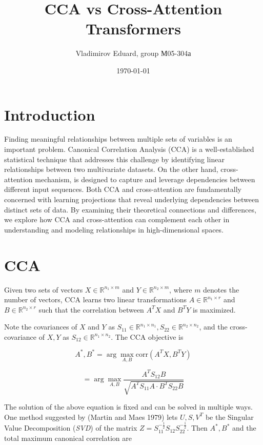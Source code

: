\documentclass[a4paper,14pt]{article}
\author{Vladimirov Eduard, group М05-304а}
\title{\textbf{CCA vs Cross-Attention Transformers}}
\date{\today}
\newcommand{\dR}{\mathbb{R}}
\theoremstyle{plain} %
\theoremstyle{definition} %
\theoremstyle{remark} %
\begin{document}
	\maketitle
	
	\section*{Introduction}
	
	Finding meaningful relationships between multiple sets of variables is an important problem.
	Canonical Correlation Analysis (CCA) is a well-established statistical technique that addresses this challenge by identifying linear relationships between two multivariate datasets.
	On the other hand, cross-attention mechanism, is designed to capture and leverage dependencies between different input sequences.
	Both CCA and cross-attention are fundamentally concerned with learning projections that reveal underlying dependencies between distinct sets of data.
	By examining their theoretical connections and differences, we explore how CCA and cross-attention can complement each other in understanding and modeling relationships in high-dimensional spaces.
	
	\section*{CCA}
	
	Given two sets of vectors $X \in \mathbb{R}^{n_1 \times m}$ and $Y \in \mathbb{R}^{n_2 \times m}$, where $m$ denotes the number of vectors, CCA learns two linear transformations $A \in \mathbb{R}^{n_1 \times r}$ and $B \in \mathbb{R}^{n_2 \times r}$ such that the correlation between $A^T X$ and $B^T Y$ is maximized.
	
	Note the covariances of $X$ and $Y$ as $S_{11} \in \dR^{n_1 \times n_1}, S_{22} \in \dR^{n_2 \times n_2}$, and the cross-covariance of $X, Y$ as $S_{12} \in \dR^{n_1 \times n_2}$. The CCA objective is 
	
	\[
	A^*, B^* = \arg \max_{A,B} \text{corr}(A^T X, B^T Y)
	\]
	
	\[
	= \arg \max_{A,B} \frac{A^T S_{12} B}{\sqrt{A^T S_{11} A \cdot B^T S_{22} B}} \tag{1}
	\]
	
	The solution of the above equation is fixed and can be solved in multiple ways. One method suggested by (Martin and Maes 1979) lets $U, S, V^T$ be the Singular Value Decomposition (\textit{SVD}) of the matrix $Z = S_{11}^{- \frac{1}{2}} S_{12} S_{22}^{- \frac{1}{2}}$. Then $A^*, B^*$ and the total maximum canonical correlation are 
	
\end{document}
